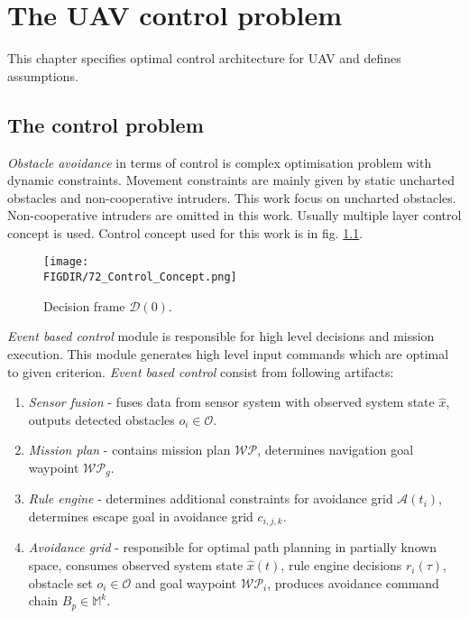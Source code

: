 \chapter{The UAV control problem}\label{ch:UAVControlProblem}
\noindent This chapter specifies optimal control architecture for UAV and defines assumptions.
\section{The control problem}
\noindent \textit{Obstacle avoidance} in terms of control is complex optimisation problem with dynamic constraints. Movement constraints are mainly given by static uncharted obstacles and non-cooperative intruders. This work focus on uncharted obstacles. Non-cooperative intruders are omitted in this work. Usually multiple layer control concept is used. Control concept used for this work is in fig. \ref{fig:controlConceptIntro}.
\begin{figure}[H]
    \centering
    \texttt{[image: \\FIGDIR/72\_Control\_Concept.png]}
    \caption{Decision frame $\mathscr{D}(0)$.}
    \label{fig:controlConceptIntro}
\end{figure}

\noindent \textit{Event based control} module is responsible for high level decisions and mission execution. This module generates high level input commands which are optimal to given criterion. \textit{Event based control} consist from following artifacts:
\begin{enumerate}
    \item \textit{Sensor fusion} - fuses data from sensor system with observed system state $\hat{x}$, outputs detected obstacles $o_i\in\mathscr{O}$.
    \item \textit{Mission plan} - contains mission plan $\mathscr{WP}$, determines navigation goal waypoint $\mathscr{WP}_g$.
    \item \textit{Rule engine} - determines additional constraints for avoidance grid $\mathscr{A}(t_i)$, determines escape goal in avoidance grid $c_{i,j,k}$.
    \item \textit{Avoidance grid} - responsible for optimal path planning in partially known space, consumes observed system state $\hat{x}(t)$, rule engine decisions $r_i(\tau)$, obstacle set $o_i\in\mathscr{O}$ and goal waypoint $\mathscr{WP}_i$, produces avoidance command chain $B_p \in \mathbb{M}^k$.
\end{enumerate}

